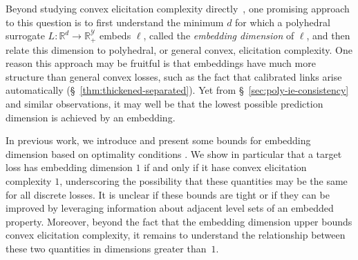 \documentclass[twoside,11pt]{article}
\newcommand{\reals}{\mathbb{R}}
\newcommand{\Y}{\mathcal{Y}}
\begin{document}
Beyond studying convex elicitation complexity directly~\citep{ramaswamy2016convex,finocchiaro2021unifying,frongillo2021elicitation},
one promising approach to this question is to first understand the minimum $d$ for which a polyhedral surrogate $L:\reals^d\to \reals^\Y_+$ embeds $\ell$, called the \emph{embedding dimension} of $\ell$, and then relate this dimension to polyhedral, or general convex, elicitation complexity.
One reason this approach may be fruitful is that embeddings have much more structure than general convex losses, such as the fact that calibrated links arise automatically (\S~\ref{thm:thickened-separated}).
Yet from \S~\ref{sec:poly-ie-consistency} and similar observations, it may well be that the lowest possible prediction dimension is achieved by an embedding.

In previous work, we introduce and present some bounds for embedding dimension
based on optimality conditions \citep{finocchiaro2020embedding}.
We show in particular that a target loss has embedding dimension $1$ if and only if it hase convex elicitation complexity $1$, underscoring the possibility that these quantities may be the same for all discrete losses.
It is unclear if these bounds are tight or if they can be improved by leveraging information about adjacent level sets of an embedded property.
Moreover, beyond the fact that the embedding dimension upper bounds convex elicitation complexity, it remains to understand the relationship between these two quantities in dimensions greater than~$1$.
\end{document}
